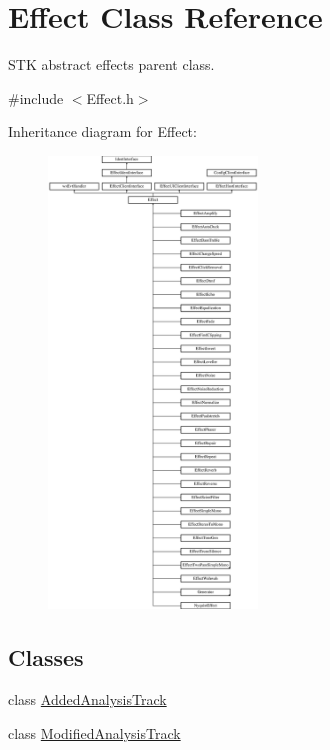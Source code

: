 \hypertarget{class_effect}{}\section{Effect Class Reference}
\label{class_effect}


S\+TK abstract effects parent class.  




{\ttfamily \#include $<$Effect.\+h$>$}

Inheritance diagram for Effect\+:\begin{figure}[H]
\begin{center}
\leavevmode
\includegraphics[height=12.000000cm]{class_effect}
\end{center}
\end{figure}
\subsection*{Classes}
\begin{DoxyCompactItemize}
\item 
class \hyperlink{class_effect_1_1_added_analysis_track}{Added\+Analysis\+Track}
\item 
class \hyperlink{class_effect_1_1_modified_analysis_track}{Modified\+Analysis\+Track}
\end{DoxyCompactItemize}
